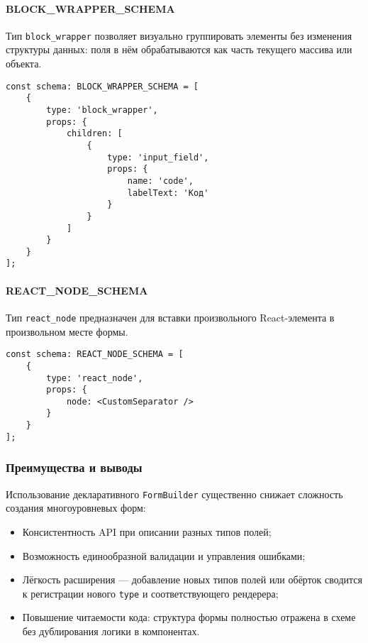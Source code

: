 \paragraph{BLOCK\_WRAPPER\_SCHEMA}
Тип \texttt{block\_wrapper} позволяет визуально группировать элементы без изменения структуры данных: поля в нём обрабатываются как часть текущего массива или объекта.

\begin{lstlisting}[caption={Пример BLOCK\_WRAPPER\_SCHEMA}]
const schema: BLOCK_WRAPPER_SCHEMA = [
	{
		type: 'block_wrapper',
		props: {
			children: [
				{
					type: 'input_field',
					props: {
						name: 'code',
						labelText: 'Код'
					}
				}
			]
		}
	}
];
\end{lstlisting}

\paragraph{REACT\_NODE\_SCHEMA}
Тип \texttt{react\_node} предназначен для вставки произвольного React-элемента в произвольном месте формы.
\begin{lstlisting}[caption={Пример REACT\_NODE\_SCHEMA}]
const schema: REACT_NODE_SCHEMA = [
	{
		type: 'react_node',
		props: {
			node: <CustomSeparator />
		}
	}
];
\end{lstlisting}

\subsubsection{Преимущества и выводы}
Использование декларативного \texttt{FormBuilder} существенно снижает сложность создания многоуровневых форм:
\begin{itemize}
	\item Консистентность API при описании разных типов полей;
	\item Возможность единообразной валидации и управления ошибками;
	\item Лёгкость расширения — добавление новых типов полей или обёрток сводится к регистрации нового \texttt{type} и соответствующего рендерера;
	\item Повышение читаемости кода: структура формы полностью отражена в схеме без дублирования логики в компонентах.
\end{itemize}

